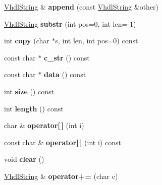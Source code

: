 \begin{DoxyCompactItemize}
\mbox{\hyperlink{class_vhdl_string}{Vhdl\+String}} \& {\bfseries append} (const \mbox{\hyperlink{class_vhdl_string}{Vhdl\+String}} \&other)
\item 
\mbox{\label{class_vhdl_string_ab19c70bd559db2d839ad189dba7d4308}} 
\mbox{\hyperlink{class_vhdl_string}{Vhdl\+String}} {\bfseries substr} (int pos=0, int len=-\/1)
\item 
\mbox{\label{class_vhdl_string_ae74bb84c2809baf748cf273204aabd20}} 
int {\bfseries copy} (char $\ast$s, int len, int pos=0) const
\item 
\mbox{\label{class_vhdl_string_ad96df721e6356eb61ea3a3caa92596c8}} 
const char $\ast$ {\bfseries c\+\_\+str} () const
\item 
\mbox{\label{class_vhdl_string_a4dc4569c650b9a60f615c5a9dae75665}} 
const char $\ast$ {\bfseries data} () const
\item 
\mbox{\label{class_vhdl_string_a4b2f992a1dc39ae0786ad0a193cc9707}} 
int {\bfseries size} () const
\item 
\mbox{\label{class_vhdl_string_a1218b098a4f69fe3ab3d96e378d14f7b}} 
int {\bfseries length} () const
\item 
\mbox{\label{class_vhdl_string_ab395ac8365ea53886555cb1726262d38}} 
char \& {\bfseries operator\mbox{[}$\,$\mbox{]}} (int i)
\item 
\mbox{\label{class_vhdl_string_a7fc6294c4a6658326f63dba3f1060be5}} 
const char \& {\bfseries operator\mbox{[}$\,$\mbox{]}} (int i) const
\item 
\mbox{\label{class_vhdl_string_a5deab91a4101cbd3fe7a08970b673697}} 
void {\bfseries clear} ()
\item 
\mbox{\label{class_vhdl_string_accbd0109902958307ae5a7f852a01289}} 
\mbox{\hyperlink{class_vhdl_string}{Vhdl\+String}} \& {\bfseries operator+=} (char c)
\item 
\mbox{\label{class_vhdl_string_a6b3ffe71a23d70e319ec82b817f32181}} 

\end{DoxyCompactItemize}

